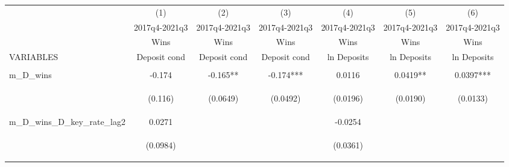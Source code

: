 \documentclass[]{article}
\begin{document}
\begin{center}
\begin{tabular}{lcccccc} \hline
 & (1) & (2) & (3) & (4) & (5) & (6) \\
 & 2017q4-2021q3 & 2017q4-2021q3 & 2017q4-2021q3 & 2017q4-2021q3 & 2017q4-2021q3 & 2017q4-2021q3 \\
 & Wins & Wins & Wins & Wins & Wins & Wins \\
VARIABLES & Deposit cond & Deposit cond & Deposit cond & ln Deposits & ln Deposits & ln Deposits \\ \hline
\vspace{4pt} & \begin{footnotesize}\end{footnotesize} & \begin{footnotesize}\end{footnotesize} & \begin{footnotesize}\end{footnotesize} & \begin{footnotesize}\end{footnotesize} & \begin{footnotesize}\end{footnotesize} & \begin{footnotesize}\end{footnotesize} \\
m\_D\_wins & -0.174 & -0.165** & -0.174*** & 0.0116 & 0.0419** & 0.0397*** \\
\vspace{4pt} & \begin{footnotesize}(0.116)\end{footnotesize} & \begin{footnotesize}(0.0649)\end{footnotesize} & \begin{footnotesize}(0.0492)\end{footnotesize} & \begin{footnotesize}(0.0196)\end{footnotesize} & \begin{footnotesize}(0.0190)\end{footnotesize} & \begin{footnotesize}(0.0133)\end{footnotesize} \\
m\_D\_wins\_D\_key\_rate\_lag2 & 0.0271 &  &  & -0.0254 &  &  \\
\vspace{4pt} & \begin{footnotesize}(0.0984)\end{footnotesize} & \begin{footnotesize}\end{footnotesize} & \begin{footnotesize}\end{footnotesize} & \begin{footnotesize}(0.0361)\end{footnotesize} & \begin{footnotesize}\end{footnotesize} & \begin{footnotesize}\end{footnotesize} \\

\end{tabular}
\end{center}
\end{document}
